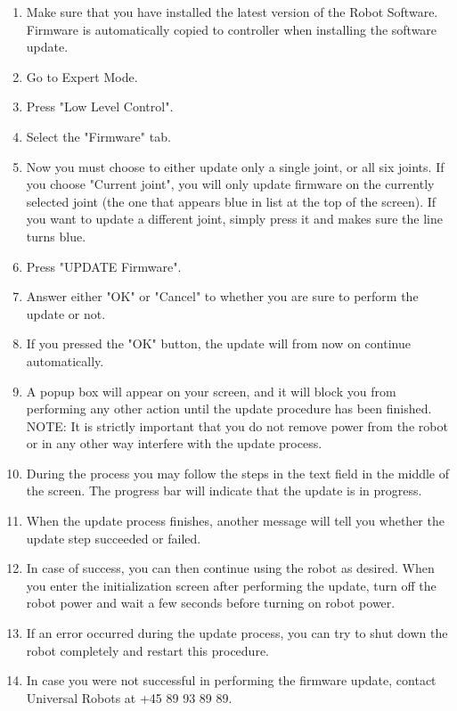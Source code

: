 \documentclass[
a4paper,
12pt,
oneside,
headsepline,		%
footsepline,		%
]{scrbook}
\begin{document}
\begin{enumerate}
\item Make sure that you have installed the latest version of the Robot Software. Firmware is automatically copied to controller when installing the software update.
\item Go to Expert Mode.
\item Press "Low Level Control".
\item Select the "Firmware" tab.
\item Now you must choose to either update only a single joint, or all six joints. If you choose "Current joint", you will only update firmware on the currently selected joint (the one that appears blue in list at the top of the screen). If you want to update a different joint, simply press it and makes sure the line turns blue.
\item Press "UPDATE Firmware".
\item Answer either "OK" or "Cancel" to whether you are sure to perform the update or not.
\item If you pressed the "OK" button, the update will from now on continue automatically.
\item A popup box will appear on your screen, and it will block you from performing any other action until the update procedure has been finished. NOTE: It is strictly important that you do not remove power from the robot or in any other way interfere with the update process.
\item During the process you may follow the steps in the text field in the middle of the screen. The progress bar will indicate that the update is in progress.
\item When the update process finishes, another message will tell you whether the update step succeeded or failed.
\item In case of success, you can then continue using the robot as desired. When you enter the initialization screen after performing the update, turn off the robot power and wait a few seconds before turning on robot power.
\item If an error occurred during the update process, you can try to shut down the robot completely and restart this procedure.
\item In case you were not successful in performing the firmware update, contact Universal Robots at +45 89 93 89 89. 
\end{enumerate}
\end{document}
